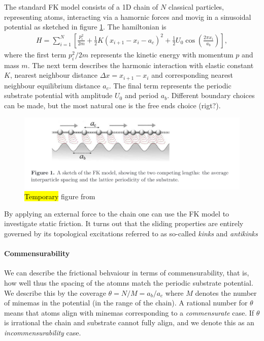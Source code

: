 The standard FK model consists of a 1D chain of $N$ classical
particles, representing atoms, interacting via a hamornic forces and movig in a
sinusoidal potential as sketched in figure \ref{fig:FK_model}. The hamiltonian
is 
\begin{align}
  H = \sum_{i=1}^N \left[\frac{p_i^2}{2m} + \frac{1}{2}K(x_{i+1} - x_i - a_c)^2 + \frac{1}{2}U_0 \cos{\left(\frac{2\pi x_i}{a_b}\right)}\right],
  \label{eq:H_FK}
\end{align}
where the first term $p_i^2/2m$ represents the kinetic energy with momentum $p$
and mass $m$. The next term describes the harmonic interaction with elastic
constant $K$, nearest neighbour distance $\Delta x = x_{i+1} - x_i$ and 
corresponding nearest neighbour equilibrium distance $a_c$. The final term represents the periodic substrate potential with amplitude $U_0$ and period $a_b$. Different boundary choices can be made, but the most natural one is the free ends choice (rigt?). 


\begin{figure}[H]
  \centering
  \includegraphics[width=0.8\linewidth]{figures/theory/FK_model.png}
  \caption{\hl{Temporary} figure from \cite{Manini_2016}}
  \label{fig:FK_model}
\end{figure}

By applying an external force to the chain one can use the FK model to
investigate static friction. It turns out that the sliding properties are entirely governed by its topological excitations referred to as so-called \textit{kinks} and \textit{antikinks}

\paragraph*{Commensurability} We can describe the frictional behvaiour in terms of commensurability, that is, how well thus the spacing of the atomns match the periodic substrate potential. We describe this by the coverage $\theta = N / M = a_b / a_c$ where $M$ denotes the number of minemas in the potential (in the range of the chain). A rational number for $\theta$ means that atoms align with minemas corresponding to a \textit{commensurate} case. If $\theta$ is irrational the chain and substrate cannot fully align, and we denote this as an \textit{incommensurability} case.


